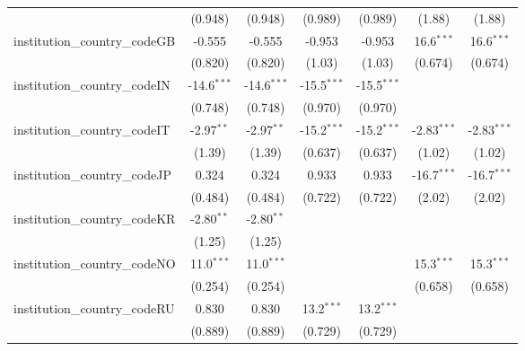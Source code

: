 \begin{tabular}{lcccccc}
                                         & (0.948)       & (0.948)       & (0.989)       & (0.989)       & (1.88)        & (1.88)\\   
   institution\_country\_codeGB          & -0.555        & -0.555        & -0.953        & -0.953        & 16.6$^{***}$  & 16.6$^{***}$\\   
                                         & (0.820)       & (0.820)       & (1.03)        & (1.03)        & (0.674)       & (0.674)\\   
   institution\_country\_codeIN          & -14.6$^{***}$ & -14.6$^{***}$ & -15.5$^{***}$ & -15.5$^{***}$ &               &   \\   
                                         & (0.748)       & (0.748)       & (0.970)       & (0.970)       &               &   \\   
   institution\_country\_codeIT          & -2.97$^{**}$  & -2.97$^{**}$  & -15.2$^{***}$ & -15.2$^{***}$ & -2.83$^{***}$ & -2.83$^{***}$\\   
                                         & (1.39)        & (1.39)        & (0.637)       & (0.637)       & (1.02)        & (1.02)\\   
   institution\_country\_codeJP          & 0.324         & 0.324         & 0.933         & 0.933         & -16.7$^{***}$ & -16.7$^{***}$\\   
                                         & (0.484)       & (0.484)       & (0.722)       & (0.722)       & (2.02)        & (2.02)\\   
   institution\_country\_codeKR          & -2.80$^{**}$  & -2.80$^{**}$  &               &               &               &   \\   
                                         & (1.25)        & (1.25)        &               &               &               &   \\   
   institution\_country\_codeNO          & 11.0$^{***}$  & 11.0$^{***}$  &               &               & 15.3$^{***}$  & 15.3$^{***}$\\   
                                         & (0.254)       & (0.254)       &               &               & (0.658)       & (0.658)\\   
   institution\_country\_codeRU          & 0.830         & 0.830         & 13.2$^{***}$  & 13.2$^{***}$  &               &   \\   
                                         & (0.889)       & (0.889)       & (0.729)       & (0.729)       &               &   \\   

\end{tabular}
